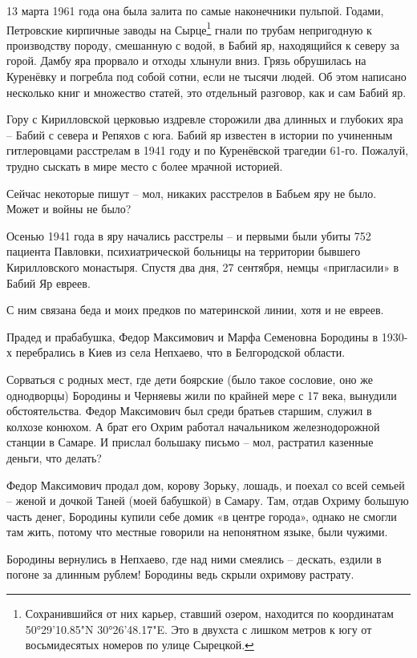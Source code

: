 13 марта 1961 года она была залита по самые наконечники пульпой. Годами, Петровские кирпичные заводы на Сырце\footnote{Сохранившийся от них карьер, ставший озером, находится по координатам 50°29'10.85"N 30°26'48.17"E. Это в двухста с лишком метров к югу от восьмидесятых номеров по улице Сырецкой.} гнали по трубам непригодную к производству породу, смешанную с водой, в Бабий яр, находящийся к северу за горой. Дамбу яра прорвало и отходы хлынули вниз. Грязь обрушилась на Куренёвку и погребла под собой сотни, если не тысячи людей. Об этом написано несколько книг и множество статей, это отдельный разговор, как и сам Бабий яр.

Гору с Кирилловской церковью издревле сторожили два длинных и глубоких яра – Бабий с севера и Репяхов с юга. Бабий яр известен в истории по учиненным гитлеровцами расстрелам в 1941 году и по Куренёвской трагедии 61-го. Пожалуй, трудно сыскать в мире место с более мрачной историей.

Сейчас некоторые пишут – мол, никаких расстрелов в Бабьем яру не было. Может и войны не было?

Осенью 1941 года в яру начались расстрелы – и первыми были убиты 752 пациента Павловки, психиатрической больницы на территории бывшего Кирилловского монастыря. Спустя два дня, 27 сентября, немцы «пригласили» в Бабий Яр евреев.

С ним связана беда и моих предков по материнской линии, хотя и не евреев.

Прадед и прабабушка, Федор Максимович и Марфа Семеновна Бородины в 1930-х перебрались в Киев из села Непхаево, что в Белгородской области. 

Сорваться с родных мест, где дети боярские (было такое сословие, оно же однодворцы) Бородины и Черняевы жили по крайней мере с 17 века, вынудили обстоятельства. Федор Максимович был среди братьев старшим, служил в колхозе конюхом. А брат его Охрим работал начальником железнодорожной станции в Самаре. И прислал большаку письмо – мол, растратил казенные деньги, что делать?

Федор Максимович продал дом, корову Зорьку, лошадь, и поехал со всей семьей – женой и дочкой Таней (моей бабушкой) в Самару. Там, отдав Охриму большую часть денег, Бородины купили себе домик «в центре города», однако не смогли там жить, потому что местные говорили на непонятном языке, были чужими.

Бородины вернулись в Непхаево, где над ними смеялись – дескать, ездили в погоне за длинным рублем! Бородины ведь скрыли охримову растрату. 
 
